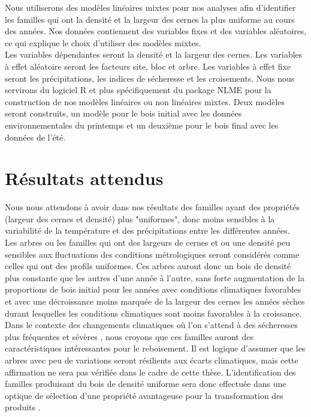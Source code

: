 \documentclass[a4paper,12pt]{report}
\begin{document}
Nous utiliserons des modèles linéaires mixtes pour nos analyses afin d'identifier les familles qui ont la densité et la largeur des cernes la plus uniforme au cours des années. Nos données contiennent des variables fixes et des variables aléatoires, ce qui explique le choix d'utiliser des modèles mixtes.\\ 
Les variables dépendantes seront la densité et la largeur des cernes. Les variables à effet aléatoire seront les facteurs site, bloc et arbre. Les variables à effet fixe seront les précipitations, les indices de sécheresse et les croisements. Nous nous servirons du logiciel R \citep{R2018} et plus spécifiquement du package NLME \citep{NLME2018} pour la construction de nos modèles linéaires ou non linéaires mixtes. Deux modèles seront construits, un modèle pour le bois initial avec les données environnementales du printemps et un deuxième pour le bois final avec les données de l'été.


\section{Résultats attendus}

Nous nous attendons à avoir dans nos résultats des familles ayant des propriétés (largeur des cernes et densité) plus "uniformes", donc moins sensibles à la variabilité de la température et des précipitations entre les différentes années.\\ 

Les arbres ou les familles qui ont des largeurs de cernes et ou une densité peu sensibles aux fluctuations des conditions métrologiques seront considérés comme celles qui ont des profils uniformes. Ces arbres auront donc un bois de densité plus constante que les autres d'une année à l'autre, sans forte augmentation de la proportions de bois initial pour les années avec conditions climatiques favorables et avec une décroissance moins marquée de la largeur des cernes les années sèches durant lesquelles les conditions climatiques sont moins favorables à la croissance. Dans le contexte des changements climatiques où l'on s'attend à des sécheresses plus fréquentes et sévères \citep{IPCC_2015}, nous croyons que ces familles auront des caractéristiques intéressantes pour le reboisement. Il est logique d'assumer que les arbres avec peu de variations seront résilients aux écarts climatiques, mais cette affirmation ne sera pas vérifiée dans le cadre de cette thèse. L'identification des familles produisant du bois de densité uniforme sera donc effectuée dans une optique de sélection d'une propriété avantageuse pour la transformation des produits \citep{Hernandez2001}. \\ 
\end{document}
